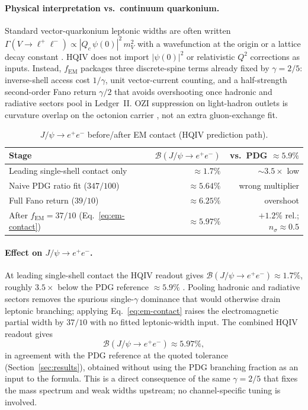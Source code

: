 \documentclass[11pt]{amsart}
\begin{document}
\paragraph{Physical interpretation vs.\ continuum quarkonium.}
Standard vector-quarkonium leptonic widths are often written
$\Gamma(V\to\ell^+\ell^-)\propto |Q_c\,\psi(0)|^2\,m_V^2$ with a wavefunction
at the origin or a lattice decay constant \cite{peskin1995,schwartz2014,pdg2024}.
HQIV does not import $| \psi(0)|^2$ or relativistic $Q^2$ corrections as inputs.
Instead, $f_{\mathrm{EM}}$ packages three discrete-spine terms already fixed by
$\gamma=2/5$: inverse-shell access cost $1/\gamma$, unit vector-current counting,
and a half-strength second-order Fano return $\gamma/2$ that avoids overshooting once
hadronic and radiative sectors pool in Ledger~II.
OZI suppression on light-hadron outlets is curvature overlap on the octonion carrier
\cite{hqiv-gluon-curvature-note}, not an extra gluon-exchange fit.

\begin{table}[ht]
\centering
\caption{$J/\psi\to e^+e^-$ before/after EM contact (HQIV prediction path).}
\label{tab:jpsi-em-before-after}
\begin{tabular}{@{}lrr@{}}
\toprule
Stage & $\mathcal{B}(J/\psi\to e^+e^-)$ & vs.\ PDG $\approx 5.9\%$ \\
\midrule
Leading single-shell contact only & $\approx 1.7\%$ & $\sim 3.5\times$ low \\
Naive PDG ratio fit ($347/100$) & $\approx 5.64\%$ & wrong multiplier \\
Full Fano return ($39/10$) & $\approx 6.25\%$ & overshoot \\
After $f_{\mathrm{EM}}=37/10$ (Eq.~\eqref{eq:em-contact}) & $\approx 5.97\%$ &
$+1.2\%$ rel.; $n_\sigma\approx 0.5$ \\
\bottomrule
\end{tabular}
\end{table}

\paragraph{Effect on $J/\psi\to e^+e^-$.}
At leading single-shell contact the HQIV readout gives
$\mathcal{B}(J/\psi\to e^+e^-)\approx 1.7\%$, roughly $3.5\times$ below the
PDG reference $\approx 5.9\%$ \cite{pdg2024,augustin1974}.
Pooling hadronic and radiative sectors removes the spurious single-$\gamma$
dominance that would otherwise drain leptonic branching; applying
Eq.~\eqref{eq:em-contact} raises the electromagnetic partial width by $37/10$
with no fitted leptonic-width input.
The combined HQIV readout gives
\begin{equation}
  \mathcal{B}(J/\psi\to e^+e^-) \approx 5.97\%,
\end{equation}
in agreement with the PDG reference \cite{pdg2024,augustin1974} at the quoted
tolerance (Section~\ref{sec:results}), obtained without using the PDG branching
fraction as an input to the formula.
This is a direct consequence of the same $\gamma=2/5$ that fixes the mass spectrum
and weak widths upstream; no channel-specific tuning is involved.
\end{document}
